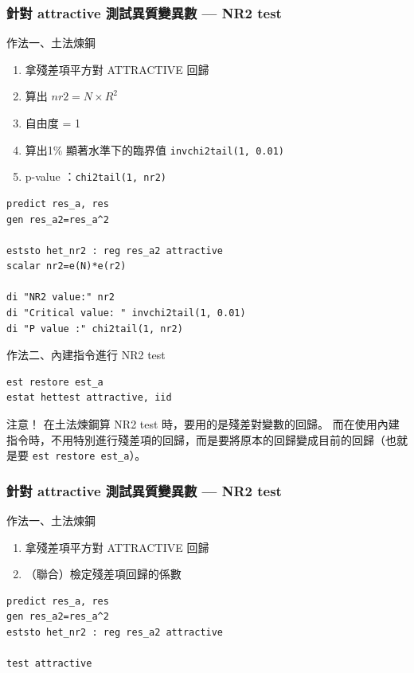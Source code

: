 \begin{frame}[fragile]
    \frametitle{針對 attractive 測試異質變異數 --- NR2 test}
    作法一、土法煉鋼
    \begin{enumerate}
        \item 拿殘差項平方對 ATTRACTIVE 回歸
        \item 算出 $nr2=N\times R^2$
        \item 自由度 = 1
        \item 算出1\% 顯著水準下的臨界值 \texttt{invchi2tail(1, 0.01)}
        \item p-value ：\texttt{chi2tail(1, nr2)}
    \end{enumerate}

    \begin{lstlisting}
predict res_a, res
gen res_a2=res_a^2

eststo het_nr2 : reg res_a2 attractive
scalar nr2=e(N)*e(r2)

di "NR2 value:" nr2
di "Critical value: " invchi2tail(1, 0.01)
di "P value :" chi2tail(1, nr2) \end{lstlisting}

\end{frame}
\begin{frame}[fragile]
    作法二、內建指令進行 NR2 test

    \begin{lstlisting}
est restore est_a
estat hettest attractive, iid \end{lstlisting}

    \vfill
    \begin{alertblock}{注意！}
        在土法煉鋼算 NR2 test 時，要用的是殘差對變數的回歸。
        而在使用內建指令時，不用特別進行殘差項的回歸，而是要將原本的回歸變成目前的回歸（也就是要 \texttt{est restore est\_a}）。
    \end{alertblock}
\end{frame}

\begin{frame}[fragile]
    \frametitle{針對 attractive 測試異質變異數 --- NR2 test}
    作法一、土法煉鋼
    \begin{enumerate}
        \item 拿殘差項平方對 ATTRACTIVE 回歸
        \item （聯合）檢定殘差項回歸的係數
    \end{enumerate}

    \begin{lstlisting}
predict res_a, res
gen res_a2=res_a^2
eststo het_nr2 : reg res_a2 attractive

test attractive  \end{lstlisting}
\end{frame}

